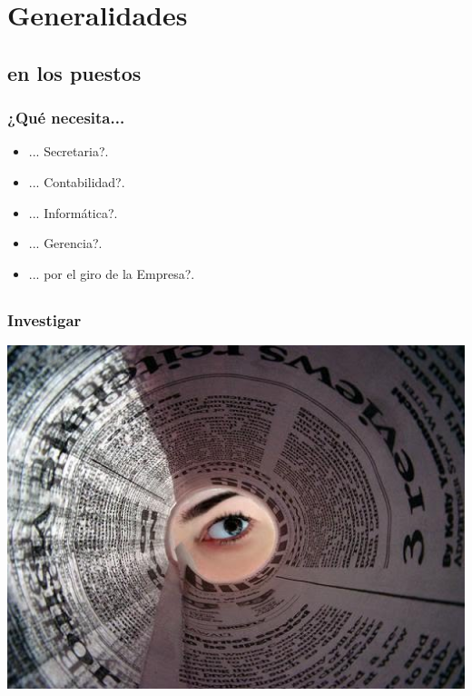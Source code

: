 %
%

\section{Generalidades}

\subsection{en los puestos}
\begin{frame}
    \frametitle{¿Qué necesita...}
        \begin{itemize}
            \item ... Secretaria?.
            \item ... Contabilidad?.
            \item ... Informática?.
            \item ... Gerencia?.
            \indent\par
            \item ... por el giro de la Empresa?.
        \end{itemize}
\end{frame}

\subsection{}
\begin{frame}
    \frametitle{Investigar}
        \includegraphics[width=\textwidth]{leyendo-periodico.jpg}
\end{frame}

